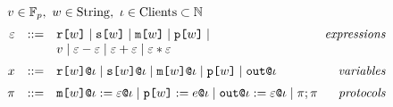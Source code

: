 \newcommand{\sx}[2]{\elab{\secret{#1}}{#2}}
\newcommand{\mx}[2]{\elab{\mesg{#1}}{#2}} 
\newcommand{\rx}[2]{\elab{\flip{#1}}{#2}}
\newcommand{\ox}[2]{\elab{\out{#1}}{#2}}
\newcommand{\signals}{\leadsto}

\newcommand{\tj}[6]{#1,#2,#3 \vdash_{#4} #5 : #6}
\newcommand{\ej}[6]{#1,#2,#3 \vdash #4 : #5,#6}
\newcommand{\cty}[2]{c(#1,#2)}
\newcommand{\setit}[1]{\{ #1 \}}
\newcommand{\ty}{T}
\newcommand{\lty}[2]{#1 \cdot #2}
\newcommand{\eqs}{\mathit{E}}
\newcommand{\toeq}[1]{\lfloor #1 \rfloor}
\newcommand{\autheq}[1]{\phi_{\mathrm{auth}}(#1)}
\newcommand{\upgrade}[1]{\uparrow #1}
\newcommand{\seclev}{\mathcal{L}}

\renewcommand{\redx}{\Rightarrow}
\renewcommand{\redxs}{\redx}
\newcommand{\abort}{\bot}
\newcommand{\pre}[1]{\ttt{pre}(#1)}
\newcommand{\post}[1]{\ttt{post}(#1)}
\newcommand{\eqflag}{\mathit{sw}}
\newcommand{\eqon}{\ttt{on}}
\newcommand{\eqoff}{\ttt{off}}
\newcommand{\eqtrans}[1]{\lfloor #1 \rfloor}
\newcommand{\mc}[4]{(#1,#2,#3,#4)}
\newcommand{\cmd}{\instr}

$$
    \begin{array}{rcl@{\hspace{2mm}}r}
      \multicolumn{4}{l}{v \in \mathbb{F}_p,\ w \in \mathrm{String},\ \cid \in \mathrm{Clients} \subset  \mathbb{N} }\\[2mm] %
      \be &::=& \flip{w} \mid \secret{w} \mid \mesg{w} \mid \rvl{w} \mid & \textit{expressions}\\
      & & v \mid \be \fminus \be \mid \be \fplus \be \mid \be \ftimes \be \\[2mm]
      x &::=& \elab{\flip{w}}{\cid} \mid \elab{\secret{w}}{\cid} \mid \elab{\mesg{w}}{\cid} \mid \rvl{w} \mid \out{\cid} & \textit{variables} \\[2mm]
      \prog &::=& \eassign{\mesg{w}}{\cid}{\be}{\cid} \mid
      \reveal{w}{e}{\cid} \mid \pubout{\cid}{\be}{\cid} \mid \prog;\prog & \textit{protocols} 
    \end{array}
$$

\bigskip
    
